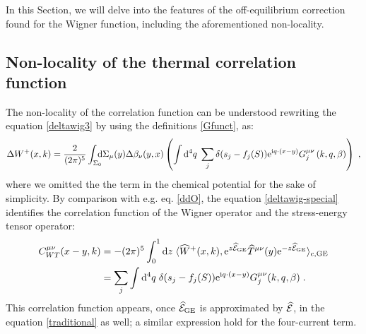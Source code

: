 \documentclass[prd,superscriptaddress,nofootinbib,notitlepage]{revtex4-1}
\def\wT{{\widehat T}}
\def\wE{{\widehat{\cal E}}}
\def\wW{\widehat W}
\newcommand{\e}{{\rm e}}
\newcommand{\di}{{\rm d}}
\newcommand{\ii}{{\rm i}}
\newcommand{\be}{\begin{equation}}
\newcommand{\ee}{\end{equation}}
\begin{document}
In this Section, we will delve into the features of the off-equilibrium correction found for the Wigner function, including the
aforementioned non-locality. 

\subsection{Non-locality of the thermal correlation function}

The non-locality of the correlation function can be understood rewriting the equation \eqref{deltawig3} by 
using the definitions \eqref{Gfunct}, as:
%
\be\label{deltawig-special}
\Delta W^+(x,k) =\frac{2}{(2\pi)^5} 
\int_{\Sigma_0} \!\!\!\! \di \Sigma_{\mu}(y) \Delta \beta_\nu(y,x) 
\left( \int \di^{4}q\; \sum_{j} \delta(s_j - f_j(S)) \e^{\ii q\cdot (x-y)} G_{j}^{\mu\nu}\left(k,q,\beta\right) \right)\;,
\ee
%
where we omitted the the term in the chemical potential for the sake of simplicity. By comparison with e.g. eq. \eqref{ddO}, the 
equation \eqref{deltawig-special} identifies the correlation function of the Wigner operator and the stress-energy tensor operator:
%
\be\label{corrfunc}
  \begin{split}
      C^{\mu\nu}_{WT}(x-y,k) &= -(2\pi)^5 \int^1_0\di z \; \langle\wW^+(x,k),\e^{z\wE_{\rm GE}}\wT^{\mu\nu}(y)\e^{-z\wE_{\rm GE}}
\rangle_{c,\mathrm{GE}}\\
&= \sum_{j} \int \di^{4}q\; \delta(s_j - f_j(S)) \e^{\ii q\cdot (x-y)} 
G_{j}^{\mu\nu}(k,q,\beta)\;. 
  \end{split}
\ee
%
This correlation function appears, once $\wE_{\rm GE}$ is approximated by $\wE$, in the equation \eqref{traditional} as well;
a similar expression hold for the four-current term. 
\end{document}
